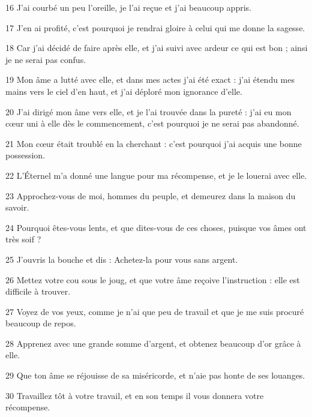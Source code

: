 \par 16 J'ai courbé un peu l'oreille, je l'ai reçue et j'ai beaucoup appris.
\par 17 J'en ai profité, c'est pourquoi je rendrai gloire à celui qui me donne la sagesse.
\par 18 Car j'ai décidé de faire après elle, et j'ai suivi avec ardeur ce qui est bon ; ainsi je ne serai pas confus.
\par 19 Mon âme a lutté avec elle, et dans mes actes j'ai été exact : j'ai étendu mes mains vers le ciel d'en haut, et j'ai déploré mon ignorance d'elle.
\par 20 J'ai dirigé mon âme vers elle, et je l'ai trouvée dans la pureté : j'ai eu mon cœur uni à elle dès le commencement, c'est pourquoi je ne serai pas abandonné.
\par 21 Mon cœur était troublé en la cherchant : c'est pourquoi j'ai acquis une bonne possession.
\par 22 L'Éternel m'a donné une langue pour ma récompense, et je le louerai avec elle.
\par 23 Approchez-vous de moi, hommes du peuple, et demeurez dans la maison du savoir.
\par 24 Pourquoi êtes-vous lents, et que dites-vous de ces choses, puisque vos âmes ont très soif ?
\par 25 J'ouvris la bouche et dis : Achetez-la pour vous sans argent.
\par 26 Mettez votre cou sous le joug, et que votre âme reçoive l'instruction : elle est difficile à trouver.
\par 27 Voyez de vos yeux, comme je n'ai que peu de travail et que je me suis procuré beaucoup de repos.
\par 28 Apprenez avec une grande somme d'argent, et obtenez beaucoup d'or grâce à elle.
\par 29 Que ton âme se réjouisse de sa miséricorde, et n'aie pas honte de ses louanges.
\par 30 Travaillez tôt à votre travail, et en son temps il vous donnera votre récompense.

